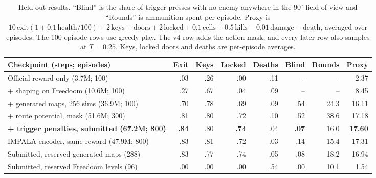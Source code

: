 \documentclass{article}
\begin{document}
\begin{table}[H]
\centering\footnotesize
\caption{Held-out results. ``Blind'' is the share of trigger presses with no enemy anywhere in the $90^\circ$ field of view and ``Rounds'' is ammunition spent per episode. Proxy is $10\,\text{exit}(1+0.1\,\text{health}/100)+2\,\text{keys}+\text{doors}+2\,\text{locked}+0.1\,\text{cells}+0.5\,\text{kills}-0.01\,\text{damage}-\text{death}$, averaged over episodes. The 100-episode rows use greedy play. The v4 row adds the action mask, and every later row also samples at $T=0.25$. Keys, locked doors and deaths are per-episode averages.}
\label{tab:results}
\setlength{\tabcolsep}{3.1pt}
\begin{tabular}{@{}lrrrrrrr@{}}
\toprule
Checkpoint (steps; episodes) & Exit & Keys & Locked & Deaths & Blind & Rounds & Proxy \\
\midrule
Official reward only (3.7M; 100) & .03 & .26 & .00 & .11 & -- & -- & 2.37 \\
+ shaping on Freedoom (10.6M; 100) & .27 & .67 & .04 & .09 & -- & -- & 8.45 \\
+ generated maps, 256 sims (36.9M; 100) & .70 & .78 & .69 & .09 & .54 & 24.3 & 16.11 \\
+ route potential, mask (51.6M; 300) & .81 & .80 & .72 & .10 & .52 & 38.6 & 17.18 \\
\textbf{+ trigger penalties, submitted (67.2M; 800)} & \textbf{.84} & .80 & \textbf{.74} & .04 & \textbf{.07} & 16.0 & \textbf{17.60} \\
IMPALA encoder, same reward (47.9M; 800) & .83 & .81 & .72 & .03 & .14 & 15.4 & 17.31 \\
\midrule
Submitted, reserved generated maps (288) & .83 & .77 & .74 & .05 & .08 & 18.2 & 16.94 \\
Submitted, reserved Freedoom levels (96) & .00 & .00 & .00 & .54 & .00 & 10.1 & 1.54 \\
\bottomrule
\end{tabular}
\end{table}
\end{document}
